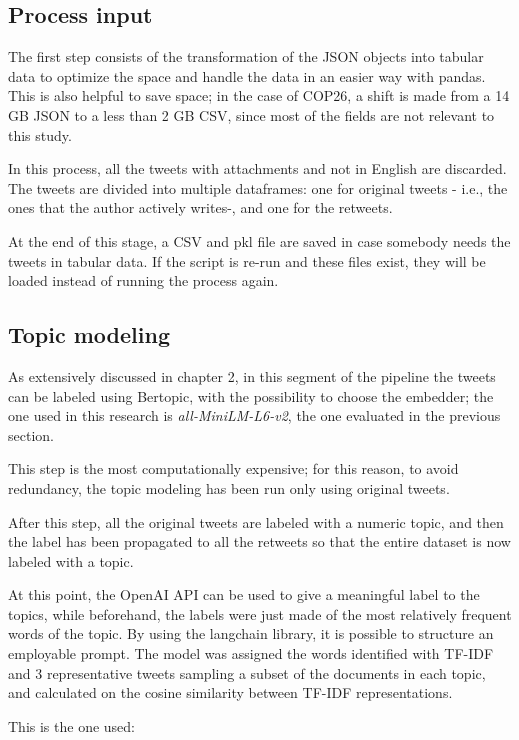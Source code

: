 \subsection{Process input}

The first step consists of the transformation of the JSON objects into tabular data to optimize the space and handle the data in an easier way with pandas. This is also helpful to save space; in the case of COP26, a shift is made from a 14 GB JSON to a less than 2 GB CSV, since most of the fields are not relevant to this study.

In this process, all the tweets with attachments and not in English are discarded. The tweets are divided into multiple dataframes: one for original tweets - i.e., the ones that the author actively writes-, and one for the retweets.

At the end of this stage, a CSV and pkl file are saved in case somebody needs the tweets in tabular data. If the script is re-run and these files exist, they will be loaded instead of running the process again.


\subsection{Topic modeling}

As extensively discussed in chapter 2, in this segment of the pipeline the tweets can be labeled using Bertopic, with the possibility to choose the embedder; the one used in this research is\textit{ all-MiniLM-L6-v2}, the one evaluated in the previous section.

This step is the most computationally expensive; for this reason, to avoid redundancy, the topic modeling has been run only using original tweets.


After this step, all the original tweets are labeled with a numeric topic, and then the label has been propagated to all the retweets so that the entire dataset is now labeled with a topic.

At this point, the OpenAI API can be used to give a meaningful label to the topics, while beforehand, the labels were just made of the most relatively frequent words of the topic. By using the langchain library, it is possible to structure an employable  prompt. The model was assigned the words identified with TF-IDF and 3 representative tweets sampling a subset of the documents in each topic, and calculated on the cosine similarity between TF-IDF representations.


This is the one used: 
\\

